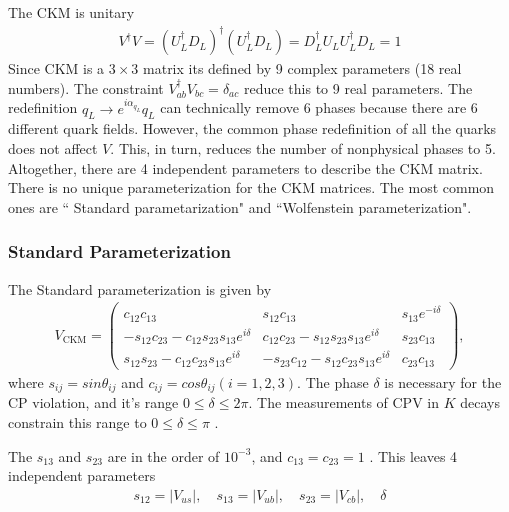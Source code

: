 The CKM is unitary 
\begin{eqnarray}
V^{\dagger} V=\left(U_{L}^{\dagger} D_{L}\right)^{\dagger}\left(U_{L}^{\dagger} D_{L}\right)=D_{L}^{\dagger} U_{L} U_{L}^{\dagger} D_{L}=1
\end{eqnarray}
Since CKM is a $3\times 3$ matrix its defined by 9 complex parameters (18 real numbers). The constraint $V_{a b}^{\dagger} V_{b c}=\delta_{a c}$ reduce this to 9 real parameters. The redefinition $q_{L} \rightarrow e^{i\alpha_{q_L}} q_{L}$ can technically remove 6 phases because there are 6 different quark fields. However, the common phase redefinition of all the quarks does not affect $V$. This, in turn, reduces the number of nonphysical phases to 5. Altogether, there are 4 independent parameters to describe the CKM matrix. There is no unique parameterization for the CKM matrices. The most common ones are `` Standard parametarization" \cite{Chau:1984fp} and ``Wolfenstein parameterization"\cite{Wolfenstein:1983yz}. 
\subsubsection{Standard Parameterization }
The Standard parameterization is given by
\begin{eqnarray}
V_{\text{CKM}}=\left(\begin{array}{ccc}{c_{12} c_{13}} & {s_{12} c_{13}} & {s_{13} e^{-i \delta}} \\ {-s_{12} c_{23}-c_{12} s_{23} s_{13} e^{i \delta}} & {c_{12} c_{23}-s_{12} s_{23} s_{13} e^{i \delta}} & {s_{23} c_{13}} \\ {s_{12} s_{23}-c_{12} c_{23} s_{13} e^{i \delta}} & {-s_{23} c_{12}-s_{12} c_{23} s_{13} e^{i \delta}} & {c_{23} c_{13}}\end{array}\right),
\end{eqnarray}
where $s_{ij}=sin\theta_{ij}$ and $c_{ij}=cos\theta_{ij}(i=1,2,3)$. The phase $\delta$ is necessary for the CP violation, and it's range $0\leq \delta\leq 2\pi$. The measurements of CPV in $K$ decays constrain this range to $0\leq \delta\leq \pi$ \cite{Buras:1998raa}.\par
The $s_{13}$ and $s_{23}$ are in the order of $10^{-3}$, and $c_{13}=c_{23}=1$ \cite{Tanabashi:2018oca}. This leaves 4 independent parameters 
\begin{eqnarray}
s_{12}=\left|V_{u s}\right|, \quad s_{13}=\left|V_{u b}\right|, \quad s_{23}=\left|V_{c b}\right|, \quad \delta
\end{eqnarray}
